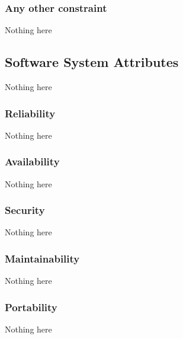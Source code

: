 \subsubsection{Any other constraint}
Nothing here


\subsection{Software System Attributes}
Nothing here

\subsubsection{Reliability}
Nothing here

\subsubsection{Availability}
Nothing here

\subsubsection{Security}
Nothing here

\subsubsection{Maintainability}
Nothing here

\subsubsection{Portability}
Nothing here
